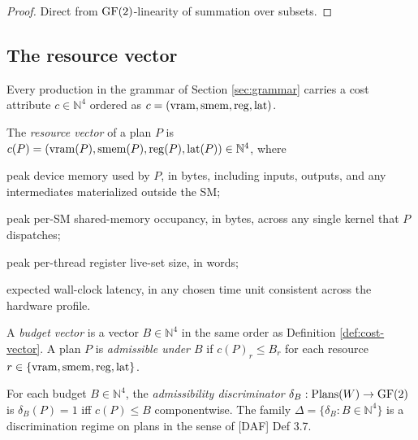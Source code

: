 \begin{proof}
  Direct from $\operatorname{GF}(2)$-linearity of summation over
  subsets.
\end{proof}

\subsection{The resource vector}\label{sec:resource-vector}

Every production in the grammar of Section
\ref{sec:grammar} carries a cost attribute
$c \in \mathbb{N}^4$ ordered as
$c = (\operatorname{vram}, \operatorname{smem}, \operatorname{reg}, \operatorname{lat})$.

\begin{definition}\label{def:cost-vector}
  The \emph{resource vector} of a plan $P$ is
  $c(P) = (\operatorname{vram}(P), \operatorname{smem}(P), \operatorname{reg}(P), \operatorname{lat}(P))
  \in \mathbb{N}^4$, where
  \begin{description}[nosep,leftmargin=0.9cm]
    \item[$\VRAM(P)$] peak device memory used by $P$,
      in bytes, including inputs, outputs, and any
      intermediates materialized outside the SM;
    \item[$\SMEM(P)$] peak per-SM shared-memory
      occupancy, in bytes, across any single kernel
      that $P$ dispatches;
    \item[$\REG(P)$] peak per-thread register live-set
      size, in words;
    \item[$\LAT(P)$] expected wall-clock latency, in
      any chosen time unit consistent across the
      hardware profile.
  \end{description}
\end{definition}

\begin{definition}\label{def:budget}
  A \emph{budget vector} is a vector $B \in
  \mathbb{N}^4$ in the same order as
  Definition \ref{def:cost-vector}. A plan $P$ is
  \emph{admissible under $B$} if $c(P)_r \leq B_r$
  for each resource $r \in \{\operatorname{vram}, \operatorname{smem}, \operatorname{reg},
  \operatorname{lat}\}$.
\end{definition}

\begin{definition}
  \label{def:admissibility-family}
  For each budget $B \in \mathbb{N}^4$, the
  \emph{admissibility discriminator} $\delta_B :
  \mathrm{Plans}(W) \to \operatorname{GF}(2)$ is $\delta_B(P) = 1$
  iff $c(P) \leq B$ componentwise. The family
  $\Delta = \{\delta_B : B \in \mathbb{N}^4\}$ is a
  discrimination regime on plans in the sense of
  [DAF] Def 3.7.
\end{definition}

